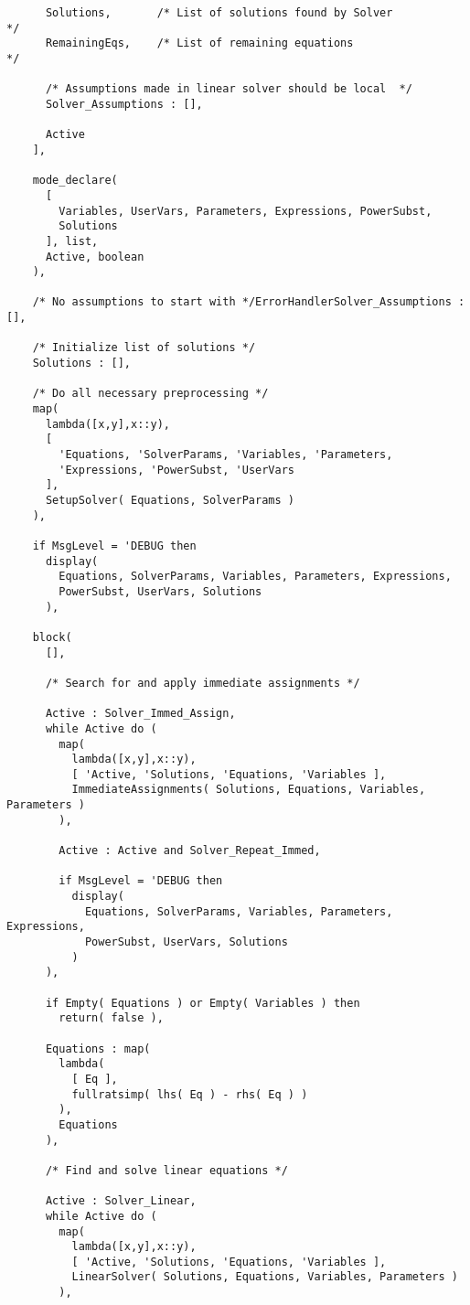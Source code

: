 \begin{verbatim}
      Solutions,       /* List of solutions found by Solver             */
      RemainingEqs,    /* List of remaining equations                   */

      /* Assumptions made in linear solver should be local  */
      Solver_Assumptions : [],

      Active
    ],

    mode_declare(
      [
        Variables, UserVars, Parameters, Expressions, PowerSubst,
        Solutions
      ], list,
      Active, boolean
    ),

    /* No assumptions to start with */ErrorHandlerSolver_Assumptions : [],

    /* Initialize list of solutions */
    Solutions : [],

    /* Do all necessary preprocessing */
    map(
      lambda([x,y],x::y),
      [
        'Equations, 'SolverParams, 'Variables, 'Parameters,
        'Expressions, 'PowerSubst, 'UserVars
      ],
      SetupSolver( Equations, SolverParams )
    ),

    if MsgLevel = 'DEBUG then
      display(
        Equations, SolverParams, Variables, Parameters, Expressions,
        PowerSubst, UserVars, Solutions
      ),

    block(
      [],

      /* Search for and apply immediate assignments */

      Active : Solver_Immed_Assign,
      while Active do (
        map(
          lambda([x,y],x::y),
          [ 'Active, 'Solutions, 'Equations, 'Variables ],
          ImmediateAssignments( Solutions, Equations, Variables, Parameters )
        ),

        Active : Active and Solver_Repeat_Immed,

        if MsgLevel = 'DEBUG then
          display(
            Equations, SolverParams, Variables, Parameters, Expressions,
            PowerSubst, UserVars, Solutions
          )
      ),

      if Empty( Equations ) or Empty( Variables ) then
        return( false ),

      Equations : map(
        lambda(
          [ Eq ],
          fullratsimp( lhs( Eq ) - rhs( Eq ) )
        ),
        Equations
      ),

      /* Find and solve linear equations */

      Active : Solver_Linear,
      while Active do (
        map(
          lambda([x,y],x::y),
          [ 'Active, 'Solutions, 'Equations, 'Variables ],
          LinearSolver( Solutions, Equations, Variables, Parameters )
        ),


\end{verbatim}
